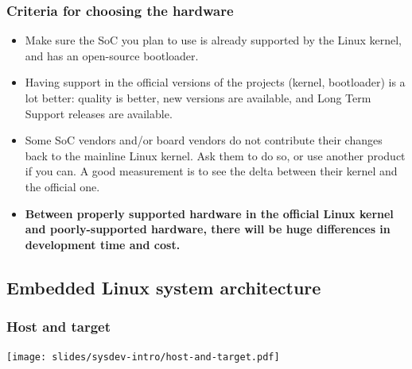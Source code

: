 \begin{frame}
  \frametitle{Criteria for choosing the hardware}
  \begin{itemize}
  \item Make sure the SoC you plan to use is already supported by
    the Linux kernel, and has an open-source bootloader.
  \item Having support in the official versions of the projects
    (kernel, bootloader) is a lot better: quality is better, new
    versions are available, and Long Term Support releases are
    available.
  \item Some SoC vendors and/or board vendors do not contribute their
    changes back to the mainline Linux kernel. Ask them to do so, or
    use another product if you can. A good measurement is to see the
    delta between their kernel and the official one.
  \item {\bf Between properly supported hardware in the official Linux
      kernel and poorly-supported hardware, there will be huge
      differences in development time and cost.}
  \end{itemize}
\end{frame}

\subsection{Embedded Linux system architecture}

\begin{frame}
  \frametitle{Host and target}
  \begin{center}
    \texttt{[image: slides/sysdev-intro/host-and-target.pdf]}
  \end{center}
\end{frame}

